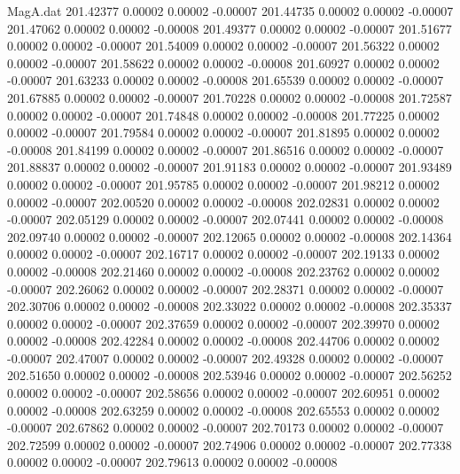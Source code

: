 \begin{filecontents}{MagA.dat}
 201.42377    0.00002    0.00002   -0.00007
 201.44735    0.00002    0.00002   -0.00007
 201.47062    0.00002    0.00002   -0.00008
 201.49377    0.00002    0.00002   -0.00007
 201.51677    0.00002    0.00002   -0.00007
 201.54009    0.00002    0.00002   -0.00007
 201.56322    0.00002    0.00002   -0.00007
 201.58622    0.00002    0.00002   -0.00008
 201.60927    0.00002    0.00002   -0.00007
 201.63233    0.00002    0.00002   -0.00008
 201.65539    0.00002    0.00002   -0.00007
 201.67885    0.00002    0.00002   -0.00007
 201.70228    0.00002    0.00002   -0.00008
 201.72587    0.00002    0.00002   -0.00007
 201.74848    0.00002    0.00002   -0.00008
 201.77225    0.00002    0.00002   -0.00007
 201.79584    0.00002    0.00002   -0.00007
 201.81895    0.00002    0.00002   -0.00008
 201.84199    0.00002    0.00002   -0.00007
 201.86516    0.00002    0.00002   -0.00007
 201.88837    0.00002    0.00002   -0.00007
 201.91183    0.00002    0.00002   -0.00007
 201.93489    0.00002    0.00002   -0.00007
 201.95785    0.00002    0.00002   -0.00007
 201.98212    0.00002    0.00002   -0.00007
 202.00520    0.00002    0.00002   -0.00008
 202.02831    0.00002    0.00002   -0.00007
 202.05129    0.00002    0.00002   -0.00007
 202.07441    0.00002    0.00002   -0.00008
 202.09740    0.00002    0.00002   -0.00007
 202.12065    0.00002    0.00002   -0.00008
 202.14364    0.00002    0.00002   -0.00007
 202.16717    0.00002    0.00002   -0.00007
 202.19133    0.00002    0.00002   -0.00008
 202.21460    0.00002    0.00002   -0.00008
 202.23762    0.00002    0.00002   -0.00007
 202.26062    0.00002    0.00002   -0.00007
 202.28371    0.00002    0.00002   -0.00007
 202.30706    0.00002    0.00002   -0.00008
 202.33022    0.00002    0.00002   -0.00008
 202.35337    0.00002    0.00002   -0.00007
 202.37659    0.00002    0.00002   -0.00007
 202.39970    0.00002    0.00002   -0.00008
 202.42284    0.00002    0.00002   -0.00008
 202.44706    0.00002    0.00002   -0.00007
 202.47007    0.00002    0.00002   -0.00007
 202.49328    0.00002    0.00002   -0.00007
 202.51650    0.00002    0.00002   -0.00008
 202.53946    0.00002    0.00002   -0.00007
 202.56252    0.00002    0.00002   -0.00007
 202.58656    0.00002    0.00002   -0.00007
 202.60951    0.00002    0.00002   -0.00008
 202.63259    0.00002    0.00002   -0.00008
 202.65553    0.00002    0.00002   -0.00007
 202.67862    0.00002    0.00002   -0.00007
 202.70173    0.00002    0.00002   -0.00007
 202.72599    0.00002    0.00002   -0.00007
 202.74906    0.00002    0.00002   -0.00007
 202.77338    0.00002    0.00002   -0.00007
 202.79613    0.00002    0.00002   -0.00008

\end{filecontents}
